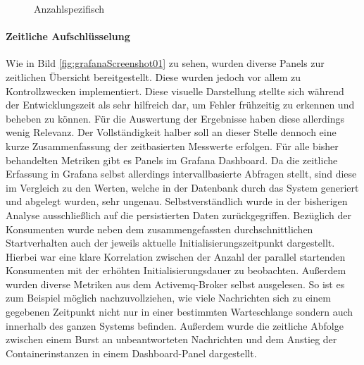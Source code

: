 \begin{figure}
  \vspace{-12mm}
  \centering
  \caption[Startzeit Container - Anzahl spezifisch]{Anzahlspezifisch}
  \label{fig:specContainers}
\end{figure}


\paragraph{Zeitliche Aufschlüsselung}
Wie in Bild \ref{fig:grafanaScreenshot01} zu sehen, wurden diverse Panels zur zeitlichen Übersicht bereitgestellt. Diese wurden jedoch vor allem zu Kontrollzwecken implementiert. Diese visuelle Darstellung stellte sich während der Entwicklungszeit als sehr hilfreich dar, um Fehler frühzeitig zu erkennen und beheben zu können. Für die Auswertung der Ergebnisse haben diese allerdings wenig Relevanz. Der Vollständigkeit halber soll an dieser Stelle dennoch eine kurze Zusammenfassung der zeitbasierten Messwerte erfolgen. Für alle bisher behandelten Metriken gibt es Panels im Grafana Dashboard. Da die zeitliche Erfassung in Grafana selbst allerdings intervallbasierte Abfragen stellt, sind diese im Vergleich zu den Werten, welche in der Datenbank durch das System generiert und abgelegt wurden, sehr ungenau. Selbstverständlich wurde in der bisherigen Analyse ausschließlich auf die persistierten Daten zurückgegriffen. Bezüglich der Konsumenten wurde neben dem zusammengefassten durchschnittlichen Startverhalten auch der jeweils aktuelle Initialisierungszeitpunkt dargestellt. Hierbei war eine klare Korrelation zwischen der Anzahl der parallel startenden Konsumenten mit der erhöhten Initialisierungsdauer zu beobachten. Außerdem wurden diverse Metriken aus dem Activemq-Broker selbst ausgelesen. So ist es zum Beispiel möglich nachzuvollziehen, wie viele Nachrichten sich zu einem gegebenen Zeitpunkt nicht nur in einer bestimmten Warteschlange sondern auch innerhalb des ganzen Systems befinden. Außerdem wurde die zeitliche Abfolge zwischen einem Burst an unbeantworteten Nachrichten und dem Anstieg der Containerinstanzen in einem Dashboard-Panel dargestellt.

